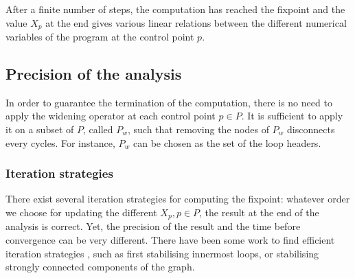 \documentclass[a4paper,english,titlepage,11pt]{report}
\begin{document}
After a finite number of steps, the computation has reached the fixpoint and the
value $X_p$ at the end gives various linear relations between the
different numerical variables of the program at the control point $p$.

\subsection{Precision of the analysis}
In order to guarantee the termination of the computation, there is no need to
apply the widening operator at each control point $p \in P$. It is sufficient to
apply it on a subset of $P$, called $P_w$, such that removing the nodes of $P_w$
disconnects every cycles. For instance, $P_w$ can be chosen as the set of the
loop headers.

\subsubsection{Iteration strategies}
There exist several iteration strategies for computing the fixpoint: whatever
order we choose for updating the different $X_p, p\in P$, the result at the
end of the analysis is correct. Yet, the precision of the result and the time
before convergence can be very different. 
There have been some work to find efficient iteration strategies
\cite{Bou92}, such as first stabilising innermost loops, or stabilising strongly
connected components of the graph.
\end{document}
